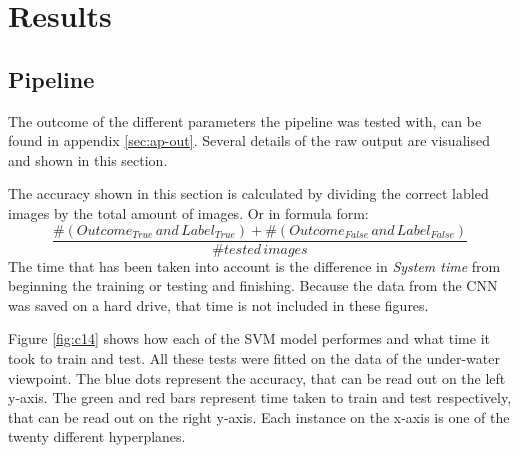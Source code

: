 \section{Results}
\label{sec:Results}




\subsection{Pipeline}
\label{sec:Results-SVM}
The outcome of the different parameters the pipeline was tested with, can be found in appendix \ref{sec:ap-out}.
Several details of the raw output are visualised and shown in this section.

The accuracy shown in this section is calculated by dividing the correct labled images by the total amount of images. Or in formula form:
\[
\frac{\#(Outcome_{True}\,and\,Label_{True})+\#(Outcome_{False}\,and\,Label_{False})}{\#tested\,images}
\]
The time that has been taken into account is the difference in \textit{System time} from beginning the training or testing and finishing.
Because the data from the CNN was saved on a hard drive, that time is not included in these figures.

Figure \ref{fig:c14} shows how each of the SVM model performes and what time it took to train and test.
All these tests were fitted on the data of the under-water viewpoint.
The blue dots represent the accuracy, that can be read out on the left y-axis.
The green and red bars represent time taken to train and test respectively, that can be read out on the right y-axis.
Each instance on the x-axis is one of the twenty different hyperplanes.

